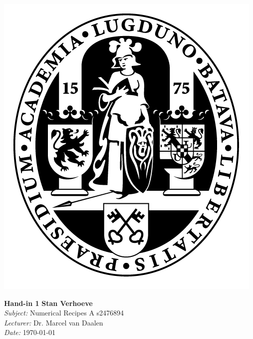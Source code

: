 \documentclass[hidelinks,a4paper,11pt]{article}
\begin{document}
\parbox{0.11\textwidth}{\includegraphics[width=\linewidth]{UL.png}}
\hspace{0.5cm}
\parbox{0.89\textwidth - 0.5cm}{
	\Large\textbf{Hand-in 1} \hspace*{\fill} \normalsize\textbf{Stan Verhoeve}\\
	\textit{Subject:} Numerical Recipes A \hspace*{\fill}s2476894\\
	\textit{Lecturer:} Dr. Marcel van Daalen\\
	\textit{Date:} \today
}




\end{document}
